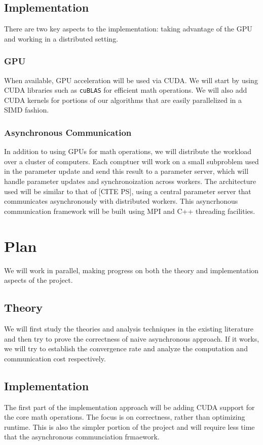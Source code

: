 \documentclass{article}
\begin{document}
\subsection{Implementation}
There are two key aspects to the implementation: taking advantage of the GPU and
working in a distributed setting.

\subsubsection{GPU}
When available, GPU acceleration will be used via CUDA. We will start by using
CUDA libraries such as \texttt{cuBLAS} for efficient math operations. We will
also add CUDA kernels for portions of our algorithms that are easily
parallelized in a SIMD fashion.

\subsubsection{Asynchronous Communication}
In addition to using GPUs for math operations, we will distribute the workload
over a cluster of computers. Each comptuer will work on a small subproblem used
in the parameter update and send this result to a parameter server, which will
handle parameter updates and synchronoization across workers. The architecture
used will be similar to that of [CITE PS], using a central parameter server that
communicates asynchronously with distributed workers. This asyncrhonous
communication framework will be built using MPI and C++ threading facilities.

\section{Plan}
We will work in parallel, making progress on both the theory and implementation
aspects of the project.

\subsection{Theory}
We will first study the theories and analysis techniques in the existing literature and then try to prove the correctness of naive asynchronous approach. If it works, we will try to establish the convergence rate and analyze the computation and communication cost respectively.  

\subsection{Implementation}
The first part of the implementation approach will be adding CUDA support for
the core math operations. The focus is on correctness, rather than optimizing
runtime. This is also the simpler portion of the project and will require less
time that the asynchronous communciation frmaework.
\end{document}
